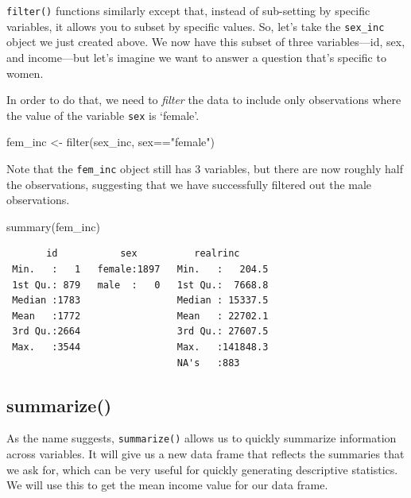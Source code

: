 \documentclass[
  letterpaper,
  DIV=11,
  numbers=noendperiod]{scrreprt}
\newenvironment{Shaded}{\begin{snugshade}}{\end{snugshade}}
\newcommand{\FunctionTok}[1]{\textcolor[rgb]{0.28,0.35,0.67}{#1}}
\newcommand{\NormalTok}[1]{\textcolor[rgb]{0.00,0.23,0.31}{#1}}
\newcommand{\OtherTok}[1]{\textcolor[rgb]{0.00,0.23,0.31}{#1}}
\newcommand{\SpecialCharTok}[1]{\textcolor[rgb]{0.37,0.37,0.37}{#1}}
\newcommand{\StringTok}[1]{\textcolor[rgb]{0.13,0.47,0.30}{#1}}
\begin{document}
\texttt{filter()} functions similarly except that, instead of
sub-setting by specific variables, it allows you to subset by specific
values. So, let's take the \texttt{sex\_inc} object we just created
above. We now have this subset of three variables---id, sex, and
income---but let's imagine we want to answer a question that's specific
to women.

In order to do that, we need to \emph{filter} the data to include only
observations where the value of the variable \texttt{sex} is `female'.

\begin{Shaded}
\begin{Highlighting}[]
\NormalTok{fem\_inc }\OtherTok{\textless{}{-}} \FunctionTok{filter}\NormalTok{(sex\_inc, sex}\SpecialCharTok{==}\StringTok{"female"}\NormalTok{)}
\end{Highlighting}
\end{Shaded}

Note that the \texttt{fem\_inc} object still has 3 variables, but there
are now roughly half the observations, suggesting that we have
successfully filtered out the male observations.

\begin{Shaded}
\begin{Highlighting}[]
\FunctionTok{summary}\NormalTok{(fem\_inc)}
\end{Highlighting}
\end{Shaded}

\begin{verbatim}
       id           sex          realrinc       
 Min.   :   1   female:1897   Min.   :   204.5  
 1st Qu.: 879   male  :   0   1st Qu.:  7668.8  
 Median :1783                 Median : 15337.5  
 Mean   :1772                 Mean   : 22702.1  
 3rd Qu.:2664                 3rd Qu.: 27607.5  
 Max.   :3544                 Max.   :141848.3  
                              NA's   :883       
\end{verbatim}

\subsection{summarize()}\label{summarize}

As the name suggests, \texttt{summarize()} allows us to quickly
summarize information across variables. It will give us a new data frame
that reflects the summaries that we ask for, which can be very useful
for quickly generating descriptive statistics. We will use this to get
the mean income value for our data frame.
\end{document}
